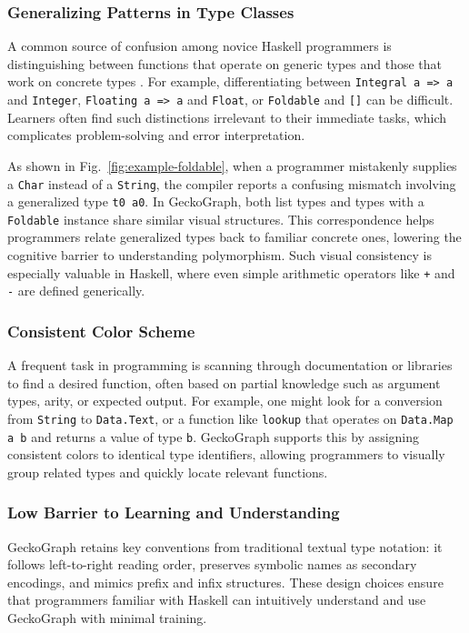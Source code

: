 \documentclass[preprint,12pt]{elsarticle}
\begin{document}
\subsubsection{Generalizing Patterns in Type Classes}
A common source of confusion among novice Haskell programmers is distinguishing between functions that operate on generic types and those that work on concrete types \cite{Tirronen2015-nr}. 
For example, differentiating between {\tt Integral a => a} and {\tt Integer}, {\tt Floating a => a} and {\tt Float}, or {\tt Foldable} and {\tt []} can be difficult. 
Learners often find such distinctions irrelevant to their immediate tasks, which complicates problem-solving and error interpretation.

As shown in Fig.~\ref{fig:example-foldable}, when a programmer mistakenly supplies a \texttt{Char} instead of a \texttt{String}, the compiler reports a confusing mismatch involving a generalized type \texttt{t0 a0}. 
In GeckoGraph, both list types and types with a \texttt{Foldable} instance share similar visual structures. 
This correspondence helps programmers relate generalized types back to familiar concrete ones, lowering the cognitive barrier to understanding polymorphism. 
Such visual consistency is especially valuable in Haskell, where even simple arithmetic operators like {\tt +} and {\tt -} are defined generically.

\subsubsection{Consistent Color Scheme}\label{par:color-scheme}
A frequent task in programming is scanning through documentation or libraries to find a desired function, often based on partial knowledge such as argument types, arity, or expected output. 
For example, one might look for a conversion from \texttt{String} to \texttt{Data.Text}, or a function like \texttt{lookup} that operates on \texttt{Data.Map a b} and returns a value of type \texttt{b}. 
GeckoGraph supports this by assigning consistent colors to identical type identifiers, allowing programmers to visually group related types and quickly locate relevant functions.

\subsubsection{Low Barrier to Learning and Understanding}
GeckoGraph retains key conventions from traditional textual type notation: it follows left-to-right reading order, preserves symbolic names as secondary encodings, and mimics prefix and infix structures. 
These design choices ensure that programmers familiar with Haskell can intuitively understand and use GeckoGraph with minimal training.
\end{document}
